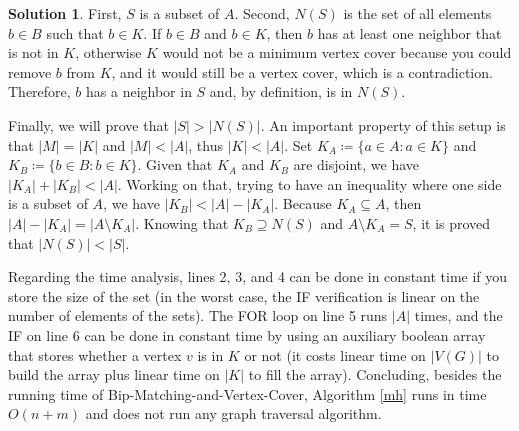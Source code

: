 \documentclass[11pt,leqno,final]{amsart}
\theoremstyle{definition}
\newtheorem{solution}{Solution}
\begin{document}
\begin{solution}
  First, $S$ is a subset of $A$. Second, $N(S)$ is the set of all elements $b \in B$ such that $b \in K$. If $b \in B $ and $b \in K$, then $b$ has at least one neighbor that is not in $K$, otherwise $K$ would not be a minimum vertex cover because you could remove $b$ from $K$, and it would still be a vertex cover, which is a contradiction. Therefore, $b$ has a neighbor in $S$ and, by definition, is in $N(S)$. 
  
  Finally, we will prove that $|S| > |N (S)|$. An important property of this setup is that $|M| = |K|$ and $|M| < |A|$, thus $|K| < |A|$. Set $K_A \coloneqq \{a \in A: a \in K\}$ and $K_B \coloneqq \{b \in B: b \in K\}$. Given that $K_A$ and $K_B$ are disjoint, we have $|K_A| + |K_B| < |A|$. Working on that, trying to have an inequality where one side is a subset of $A$, we have $|K_B| < |A| - |K_A|$. Because $K_A \subseteq A$, then $|A| - |K_A| = |A \setminus K_A|$. Knowing that $K_B \supseteq N(S)$ and $A \setminus K_A = S$, it is proved that $|N (S)| < |S|$.

  Regarding the time analysis, lines 2, 3, and 4 can be done in constant time if you store the size of the set (in the worst case, the IF verification is linear on the number of elements of the sets). The FOR loop on line 5 runs  $|A|$ times, and the IF on line 6 can be done in constant time by using an auxiliary boolean array that stores whether a vertex $v$ is in $K$ or not (it costs linear time on $|V(G)|$ to build the array plus linear time on $|K|$ to fill the array). Concluding, besides the running time of Bip-Matching-and-Vertex-Cover, Algorithm \ref{mh} runs in time $O (n + m)$ and does not run any graph traversal algorithm.

  
\end{solution}
\end{document}
